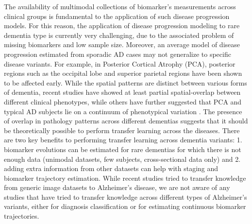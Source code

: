 \documentclass{llncs}
\begin{document}
The availability of multimodal collections of biomarker's measurements across clinical groups is fundamental to the application of such disease progression models. For this reason, the application of disease progression modeling to rare dementia type is currently very challenging, due to the associated problem of missing biomarkers and low sample size.  Moreover, an average model of disease progression estimated from sporadic AD cases may not generalize to specific disease variants. For example, in Posterior Cortical Atrophy (PCA), posterior regions such as the occipital lobe and superior parietal regions have been shown to be affected early. While the spatial patterns are distinct between various forms of dementia, recent studies \cite{Ossenkoppele2014atrophy} have showed at least partial spatial-overlap between different clinical phenotypes, while others have further suggested that PCA and typical AD subjects lie on a continuum of phenotypical variation \cite{crutch2012posterior}. The presence of overlap in pathology patterns across different dementias suggests that it should be theoretically possible to perform transfer learning across the diseases. There are two key benefits to performing transfer learning across dementia variants: 1. biomarker evolutions can be estimated for rare dementias for which there is not enough data (unimodal datasets, few subjects, cross-sectional data only) and 2. adding extra information from other datasets can help with staging and biomarker trajectory estimation. While recent studies \cite{hon2017towards} tried to transfer knowledge from generic image datasets to Alzheimer's disease, we are not aware of any studies that have tried to transfer knowledge across different types of Alzheimer's variants, either for diagnosis classification or for estimating continuous biomarker trajectories.

\end{document}
